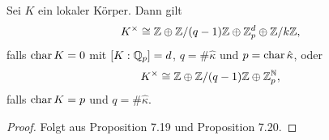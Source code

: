 \begin{Satz}
	Sei $K$ ein lokaler Körper. Dann gilt
	\[ K^\times \cong \mathbb{Z} \oplus \mathbb{Z} / (q-1) \mathbb{Z} \oplus \mathbb{Z}_p^d \oplus \mathbb{Z} / k\mathbb{Z},
	\]
	falls $\operatorname{char} K = 0$ mit $[K:\mathbb{Q}_p] = d$, $q = \#\hat{\kappa}$ und $p = \operatorname{char} \hat{\kappa}$, oder
	\[ K^\times \cong \mathbb{Z} \oplus \mathbb{Z} / (q-1) \mathbb{Z} \oplus \mathbb{Z}_p^{\mathbb{N}},
	\]
	falls $\operatorname{char} K = p$ und $q = \#\hat{\kappa}$.
\end{Satz}

\begin{proof}
	Folgt aus Proposition 7.19 und Proposition 7.20.
\end{proof}







